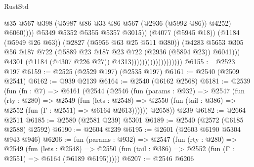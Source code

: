 \begin{lexlean}{RustStd}
\begin{coremodule}
                                                        @35
                                                        @567
                                                        @398
                                                        (@5987
                                                          @86
                                                          @33
                                                          @86
                                                          @567
                                                          (@2936 (@5992 @86))
                                                          @4252)
                                                        @6060))))
                                                @5349
                                                @5352
                                                @5355
                                                @5357
                                                @3015))
                                            (@4077 (@5945 @18))
                                            (@1184 (@5949 @26 @63))
                                            (@2827 (@5956 @63 @25 @511 @380))
                                            (@4283
                                              @5653
                                              @305
                                              @56
                                              @187
                                              @722
                                              (@5889 @23 @187 @23 @722 (@2936 (@5894 @23)) @6041)))
                                          @4301
                                          (@1184 (@4307 @226 @27))
                                          @4313)))))))))))))))))))
@6155 := @2523 @197
@6159 := @2525 (@2529 @197) (@2535 @197)
@6161 := @2540 (@2509 @2541)
@6162 := @939 @2139
@6164 := @2540 (@6162 @2568)
@6181 := @2539
    (fun (fn : @7) =>
    @6161
      (@2544
        (@2546
          (fun (params : @932) =>
          @2547
            (fun (rty : @280) =>
            @2549
              (fun (lets : @2548) =>
              @2550 (fun (tail : @386) => @2552 (fun (Γ : @2551) => @6164 @2613))))))
        @2658))
    @239
@6182 := @2664 @2511
@6185 := @2580 (@2581 @239) @5301
@6189 := @2540 (@2572 (@6185 @2588) @2592)
@6190 := @2604 @239
@6195 := @2601 (@2603 @6190 @5304 @943 @946)
@6206 := fun (params : @932) =>
  @2547
    (fun (rty : @280) =>
    @2549
      (fun (lets : @2548) =>
      @2550 (fun (tail : @386) => @2552 (fun (Γ : @2551) => @6164 (@6189 @6195)))))
@6207 := @2546 @6206

\end{coremodule}
\end{lexlean}
